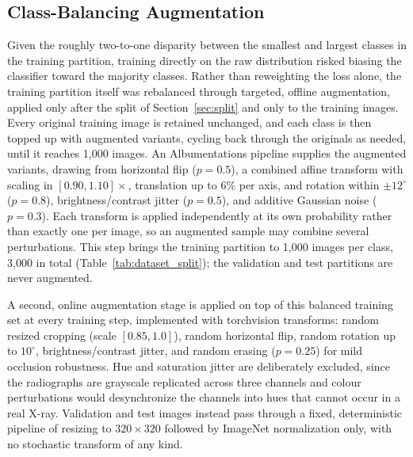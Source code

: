 \documentclass[conference]{IEEEtran}
\begin{document}
\begin{table}[!h]
\centering
\caption{Dataset Distribution: Original 70/15/15 Split, Then Training-Only Augmentation}
\label{tab:dataset_split}
\end{table}

\subsection{Class-Balancing Augmentation}
\label{sec:augmentation}
Given the roughly two-to-one disparity between the smallest and largest classes in the training partition, training directly on the raw distribution risked biasing the classifier toward the majority classes. Rather than reweighting the loss alone, the training partition itself was rebalanced through targeted, offline augmentation, applied only after the split of Section~\ref{sec:split} and only to the training images. Every original training image is retained unchanged, and each class is then topped up with augmented variants, cycling back through the originals as needed, until it reaches 1,000 images. An Albumentations \cite{buslaev2020albumentations} pipeline supplies the augmented variants, drawing from horizontal flip ($p=0.5$), a combined affine transform with scaling in $[0.90,1.10]\times$, translation up to $6\%$ per axis, and rotation within $\pm12^{\circ}$ ($p=0.8$), brightness/contrast jitter ($p=0.5$), and additive Gaussian noise ($p=0.3$). Each transform is applied independently at its own probability rather than exactly one per image, so an augmented sample may combine several perturbations. This step brings the training partition to 1,000 images per class, 3,000 in total (Table~\ref{tab:dataset_split}); the validation and test partitions are never augmented.

A second, online augmentation stage is applied on top of this balanced training set at every training step, implemented with torchvision transforms: random resized cropping (scale $[0.85,1.0]$), random horizontal flip, random rotation up to $10^{\circ}$, brightness/contrast jitter, and random erasing ($p=0.25$) for mild occlusion robustness. Hue and saturation jitter are deliberately excluded, since the radiographs are grayscale replicated across three channels and colour perturbations would desynchronize the channels into hues that cannot occur in a real X-ray. Validation and test images instead pass through a fixed, deterministic pipeline of resizing to $320\times320$ followed by ImageNet normalization only, with no stochastic transform of any kind.
\end{document}
